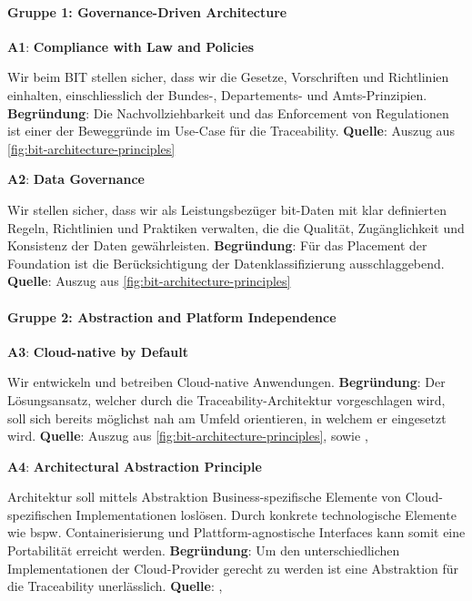 \paragraph{Gruppe 1: Governance-Driven Architecture}

\textbf{A1}: \textbf{Compliance with Law and Policies} \hypertarget{architecture-a1}{}

Wir beim BIT stellen sicher, dass wir die Gesetze, Vorschriften und Richtlinien einhalten, einschliesslich der Bundes-, Departements- und Amts-Prinzipien.
\textbf{Begründung}: Die Nachvollziehbarkeit und das Enforcement von Regulationen ist einer der Beweggründe im Use-Case für die Traceability.
\textbf{Quelle}: Auszug aus \autoref{fig:bit-architecture-principles}

\textbf{A2}: \textbf{Data Governance} \hypertarget{architecture-a2}{}

Wir stellen sicher, dass wir als Leistungsbezüger \ac{bit}-Daten mit klar definierten Regeln, Richtlinien und Praktiken verwalten, die die Qualität, Zugänglichkeit und Konsistenz der Daten gewährleisten. 
\textbf{Begründung}: Für das Placement der Foundation ist die Berücksichtigung der Datenklassifizierung ausschlaggebend.
\textbf{Quelle}: Auszug aus \autoref{fig:bit-architecture-principles}

\paragraph{Gruppe 2: Abstraction and Platform Independence}

\textbf{A3}: \textbf{Cloud-native by Default} \hypertarget{architecture-a3}{}

Wir entwickeln und betreiben Cloud-native Anwendungen.
\textbf{Begründung}: Der Lösungsansatz, welcher durch die Traceability-Architektur vorgeschlagen wird, soll sich bereits möglichst nah am Umfeld orientieren, in welchem er eingesetzt wird.
\textbf{Quelle}: Auszug aus \autoref{fig:bit-architecture-principles}, sowie \cite{srikanth_gurram_multi-cloud_2025}, \cite{erl_cloud_2013}

\textbf{A4}: \textbf{Architectural Abstraction Principle} \hypertarget{architecture-a4}{}

Architektur soll mittels Abstraktion Business-spezifische Elemente von Cloud-spezifischen Implementationen loslösen. Durch konkrete technologische Elemente wie bspw. Containerisierung und Plattform-agnostische Interfaces kann somit eine Portabilität erreicht werden.
\textbf{Begründung}: Um den unterschiedlichen Implementationen der Cloud-Provider gerecht zu werden ist eine Abstraktion für die Traceability unerlässlich.
\textbf{Quelle}: \cite{srikanth_gurram_multi-cloud_2025}, \cite{erl_cloud_2013}

